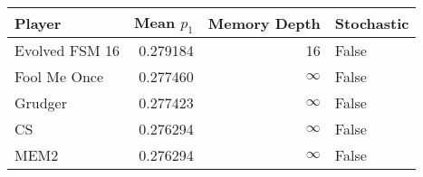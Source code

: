 \begin{tabular}{lrrl}
\toprule
         Player &  Mean $p_1$ &  Memory Depth & Stochastic \\
\midrule
 Evolved FSM 16 &    0.279184 &            16 &      False \\
   Fool Me Once &    0.277460 &            \(\infty\) &      False \\
        Grudger &    0.277423 &            \(\infty\) &      False \\
             CS &    0.276294 &            \(\infty\) &      False \\
           MEM2 &    0.276294 &            \(\infty\) &      False \\
\bottomrule
\end{tabular}
